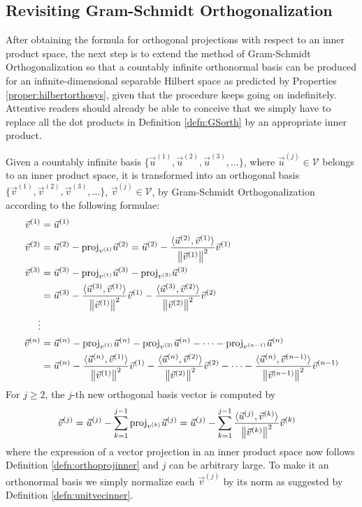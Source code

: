 \subsection{Revisiting Gram-Schmidt Orthogonalization}
\label{section:GSorthinnersec}

After obtaining the formula for orthogonal projections with respect to an inner product space, the next step is to extend the method of Gram-Schmidt Orthogonalization so that a countably infinite orthonormal basis can be produced for an infinite-dimensional separable Hilbert space as predicted by Properties \ref{proper:hilbertorthosys}, given that the procedure keeps going on indefinitely. Attentive readers should already be able to conceive that we simply have to replace all the dot products in Definition \ref{defn:GSorth} by an appropriate inner product. 
\begin{defn}
\label{defn:GSorthinner}
Given a countably infinite basis $\{\vec{u}^{(1)}, \vec{u}^{(2)}, \vec{u}^{(3)}, \ldots\}$, where $\vec{u}^{(j)} \in \mathcal{V}$ belongs to an inner product space, it is transformed into an orthogonal basis $\{\vec{v}^{(1)}, \vec{v}^{(2)}, \vec{v}^{(3)}, \ldots\}$, $\vec{v}^{(j)} \in \mathcal{V}$, by Gram-Schmidt Orthogonalization according to the following formulae:
\begin{align*}
\vec{v}^{(1)} &= \vec{u}^{(1)} \\
\vec{v}^{(2)} &= \vec{u}^{(2)} - \text{proj}_{v^{(1)}}\vec{u}^{(2)} = \vec{u}^{(2)} - \frac{\langle \vec{u}^{(2)}, \vec{v}^{(1)}\rangle}{\norm{\vec{v}^{(1)}}^2} \vec{v}^{(1)} \\
\vec{v}^{(3)} &= \vec{u}^{(3)} - \text{proj}_{v^{(1)}}\vec{u}^{(3)} - \text{proj}_{v^{(2)}}\vec{u}^{(3)} \\
&= \vec{u}^{(3)} - \frac{\langle\vec{u}^{(3)}, \vec{v}^{(1)}\rangle}{\norm{\vec{v}^{(1)}}^2} \vec{v}^{(1)} - \frac{\langle\vec{u}^{(3)}, \vec{v}^{(2)}\rangle}{\norm{\vec{v}^{(2)}}^2} \vec{v}^{(2)} \\
\vdots \\
\vec{v}^{(n)} &= \vec{u}^{(n)} - \text{proj}_{v^{(1)}}\vec{u}^{(n)} - \text{proj}_{v^{(2)}}\vec{u}^{(n)} - \cdots - \text{proj}_{v^{(n-1)}}\vec{u}^{(n)} \\
&= \vec{u}^{(n)} - \frac{\langle\vec{u}^{(n)}, \vec{v}^{(1)}\rangle}{\norm{\vec{v}^{(1)}}^2} \vec{v}^{(1)} - \frac{\langle\vec{u}^{(n)}, \vec{v}^{(2)}\rangle}{\norm{\vec{v}^{(2)}}^2} \vec{v}^{(2)} - \cdots - \frac{\langle\vec{u}^{(n)}, \vec{v}^{(n-1)}\rangle}{\norm{\vec{v}^{(n-1)}}^2} \vec{v}^{(n-1)}
\end{align*}
For $j \geq 2$, the $j$-th new orthogonal basis vector is computed by
\begin{align*}
\vec{v}^{(j)} &= \vec{u}^{(j)} - \sum_{k=1}^{j-1}\text{proj}_{v^{(k)}}\vec{u}^{(j)}  = \vec{u}^{(j)} - \sum_{k=1}^{j-1}\frac{\langle \vec{u}^{(j)}, \vec{v}^{(k)} \rangle}{\norm{\vec{v}^{(k)}}^2} \vec{v}^{(k)}
\end{align*}
where the expression of a vector projection in an inner product space now follows Definition \ref{defn:orthoprojinner} and $j$ can be arbitrary large. To make it an orthonormal basis we simply normalize each $\vec{v}^{(j)}$ by its norm as suggested by Definition \ref{defn:unitvecinner}.  
\end{defn}
